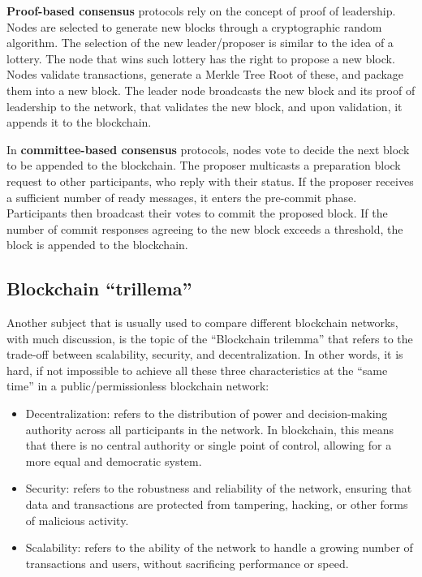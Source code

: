 \textbf{Proof-based consensus} protocols rely on the concept of proof of leadership. Nodes are selected to generate new blocks through a cryptographic random algorithm. The selection of the new leader/proposer is similar to the idea of a lottery. The node that wins such lottery has the right to propose a new block.
Nodes validate transactions, generate a Merkle Tree Root of these, and package them into a new block. The leader node broadcasts the new block and its proof of leadership to the network, that validates the new block, and upon validation, it appends it to the blockchain.

In \textbf{committee-based consensus} protocols, nodes vote to decide the next block to be appended to the blockchain. The proposer multicasts a preparation block request to other participants, who reply with their status. If the proposer receives a sufficient number of ready messages, it enters the pre-commit phase. Participants then broadcast their votes to commit the proposed block. If the number of commit responses agreeing to the new block exceeds a threshold, the block is appended to the blockchain.

\subsection*{Blockchain ``trillema''}

Another subject that is usually used to compare different blockchain networks, with much discussion, is the topic of the ``Blockchain trilemma'' that refers to the trade-off between scalability, security, and decentralization. 
In other words, it is hard, if not impossible to achieve all these three characteristics at the ``same time'' in a public/permissionless blockchain network:
\begin{itemize}
    \item Decentralization: refers to the distribution of power and decision-making authority across all participants in the network. In blockchain, this means that there is no central authority or single point of control, allowing for a more equal and democratic system.
    \item Security: refers to the robustness and reliability of the network, ensuring that data and transactions are protected from tampering, hacking, or other forms of malicious activity.
    \item Scalability: refers to the ability of the network to handle a growing number of transactions and users, without sacrificing performance or speed.
\end{itemize}

